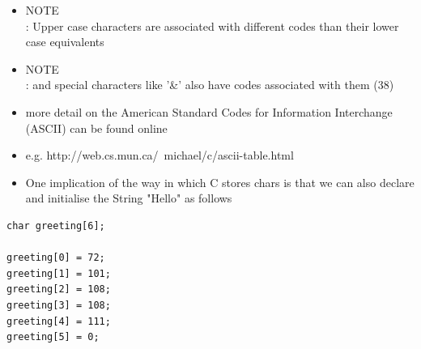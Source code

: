 \documentclass{beamer}
\begin{document}
\begin{frame}
\begin{itemize}
\item NOTE\\: Upper case characters are associated with different codes than their lower case equivalents
\item NOTE\\: and special characters like '\&' also have codes associated with them (38)
\item more detail on the American Standard Codes for Information Interchange (ASCII) can be found online
\item e.g. http://web.cs.mun.ca/~michael/c/ascii-table.html

\end{itemize}
\end{frame}

\begin{frame}[fragile]
\begin{itemize}
\item One implication of the way in which C stores chars is that we can also declare and initialise the String "Hello" as follows
\end{itemize}

\begin{block}{}
\begin{lstlisting}
char greeting[6];

greeting[0] = 72;
greeting[1] = 101;
greeting[2] = 108;
greeting[3] = 108;
greeting[4] = 111;
greeting[5] = 0;

\end{lstlisting}
\end{block} 
\end{frame}
\end{document}

